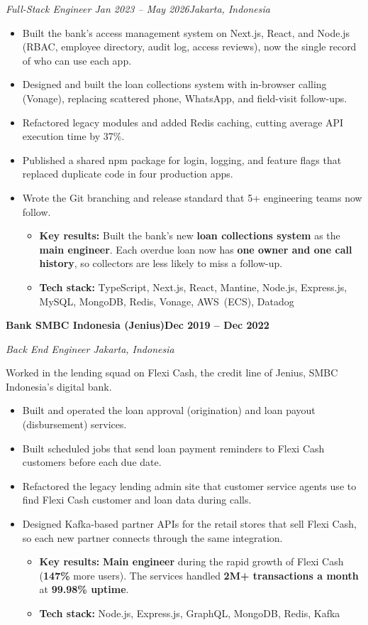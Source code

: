 \documentclass[11pt,letterpaper]{article}
\newcommand{\company}[2]{%
  \Needspace{8\baselineskip}
  \vspace{8pt}
  {\headfont\bfseries\color{heading}#1\hfill#2\par}
}
\newcommand{\role}[4]{%
  \Needspace{6\baselineskip}
  \vspace{2pt}
  {\itshape\color{muted}#1\if\relax\detokenize{#2}\relax\else{} \textbar{} #2\fi\hfill #3\par}
  \vspace{1pt}
  #4\par
}
\newcommand{\keyResults}[1]{\item \textbf{Key results:} #1}
\newcommand{\techStack}[1]{\item \textbf{Tech stack:} #1}
\begin{document}
\vspace{6pt}
\role{Full-Stack Engineer}{Jan 2023 -- May 2026}{Jakarta, Indonesia}{}
\begin{itemize}
  \item Built the bank's access management system on Next.js, React, and Node.js (RBAC, employee directory, audit log, access reviews), now the single record of who can use each app.
  \item Designed and built the loan collections system with in-browser calling (Vonage), replacing scattered phone, WhatsApp, and field-visit follow-ups.
  \item Refactored legacy modules and added Redis caching, cutting average API execution time by 37\%.
  \item Published a shared npm package for login, logging, and feature flags that replaced duplicate code in four production apps.
  \item Wrote the Git branching and release standard that 5+ engineering teams now follow.
  \begin{itemize}
    \keyResults{Built the bank's new \textbf{loan collections system} as the \textbf{main engineer}. Each overdue loan now has \textbf{one owner and one call history}, so collectors are less likely to miss a follow-up.}
    \techStack{TypeScript, Next.js, React, Mantine, Node.js, Express.js, MySQL, MongoDB, Redis, Vonage, AWS~(ECS), Datadog}
  \end{itemize}
\end{itemize}

\company{Bank SMBC Indonesia (Jenius)}{Dec 2019 -- Dec 2022}
\role{Back End Engineer}{}{Jakarta, Indonesia}{Worked in the lending squad on Flexi Cash, the credit line of Jenius, SMBC Indonesia's digital bank.}
\begin{itemize}
  \item Built and operated the loan approval (origination) and loan payout (disbursement) services.
  \item Built scheduled jobs that send loan payment reminders to Flexi Cash customers before each due date.
  \item Refactored the legacy lending admin site that customer service agents use to find Flexi Cash customer and loan data during calls.
  \item Designed Kafka-based partner APIs for the retail stores that sell Flexi Cash, so each new partner connects through the same integration.
  \begin{itemize}
    \keyResults{\textbf{Main engineer} during the rapid growth of Flexi Cash (\textbf{147\%} more users). The services handled \textbf{2M+ transactions a month} at \textbf{99.98\% uptime}.}
    \techStack{Node.js, Express.js, GraphQL, MongoDB, Redis, Kafka}
  \end{itemize}
\end{itemize}
\end{document}
